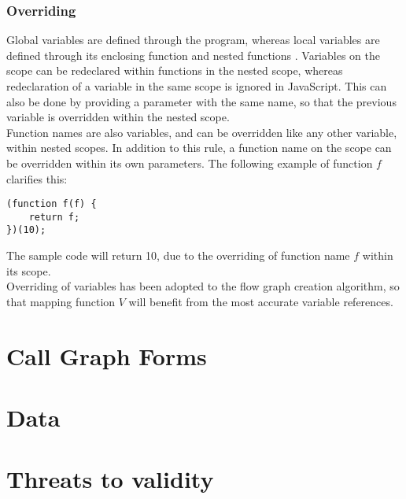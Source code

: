 \documentclass[journal,10pt]{IEEEtran} %
\begin{document}
\subsubsection{Overriding}
Global variables are defined through the program, whereas local variables are defined through its enclosing function and nested functions \cite[p. 55]{flanagan2011javascript}. Variables on the scope can be redeclared within functions in the nested scope, whereas redeclaration of a variable in the same scope is ignored in JavaScript. This can also be done by providing a parameter with the same name, so that the previous variable is overridden within the nested scope. \\
Function names are also variables, and can be overridden like any other variable, within nested scopes. In addition to this rule, a function name on the scope can be overridden within its own parameters. The following example of function $f$ clarifies this:
\vskip 6pt
\begin{verbatim}
(function f(f) {
    return f;
})(10);
\end{verbatim}
\vskip 6pt
The sample code will return 10, due to the overriding of function name $f$ within its scope. \\
Overriding of variables has been adopted to the flow graph creation algorithm, so that mapping function $V$ will benefit from the most accurate variable references. %
\section{Call Graph Forms}


\section{Data}

\section{Threats to validity}
\end{document}
